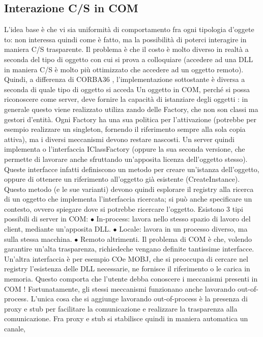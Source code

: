 \subsection{Interazione C/S in COM}
L'idea base è che vi sia uniformità di comportamento fra ogni tipologia d'oggete
to: non interessa quindi come è fatto, ma la possibilità di poterci interagire in
maniera C/S trasparente. Il problema è che il costo è molto diverso in realtà a
seconda del tipo di oggetto con cui si prova a colloquiare (accedere ad una DLL
in maniera C/S è molto più ottimizzato che accedere ad un oggetto remoto).
Quindi, a differenza di CORBA36 , l'implementazione sottostante è diversa a
seconda di quale tipo di oggetto si acceda
Un oggetto in COM, perché si possa riconoscere come server, deve fornire
la capacità di istanziare degli oggetti : in generale questo viene realizzato utiliza
zando delle Factory, che non son classi ma gestori d'entità. Ogni Factory ha
una sua politica per l'attivazione (potrebbe per esempio realizzare un singleton,
fornendo il riferimento sempre alla sola copia attiva), ma i diversi meccanismi
devono restare nascosti.
Un server quindi implementa o l'interfaccia IClassFactory (oppure la sua
seconda versione, che permette di lavorare anche sfruttando un'apposita licenza dell'oggetto stesso). Queste interfacce
infatti definiscono un metodo per
creare un'istanza dell'oggetto, oppure di ottenere un riferimento all'oggetto già
esistente (CreateInstance). Questo metodo (e le sue varianti) devono quindi
esplorare il registry alla ricerca di un oggetto che implementa l'interfaccia ricercata; si può anche specificare un
contesto, ovvero spiegare dove si potrebbe
ricercare l'oggetto.
Esistono 3 tipi possibili di server in COM:
$\bullet$ In-process: lavora nello stesso spazio di lavoro del client, mediante un'apposita DLL.
$\bullet$ Locale: lavora in un processo diverso, ma sulla stessa macchina.
$\bullet$ Remoto altrimenti.
Il problema di COM è che, volendo garantire un'alta trasparenza, richiedeche
vengano definite tantissime interfacce. Un'altra interfaccia è per esempio COe
MOBJ, che si preoccupa di cercare nel registry l'esistenza delle DLL necessarie,
ne fornisce il riferimento o le carica in memoria. Questo comporta che l'utente debba conoscere i meccanismi presenti in
COM ! Fortunatamente, gli stessi
meccanismi funzionano anche lavorando out-of-process.
L'unica cosa che si aggiunge lavorando out-of-process è la presenza di proxy
e stub per facilitare la comunicazione e realizzare la trasparenza alla comunicazione. Fra proxy e stub si stabilisce
quindi in maniera automatica un canale,
